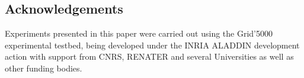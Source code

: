\documentclass[doublespacing]{bmcart}
\begin{document}
\begin{backmatter}



\section*{Acknowledgements}
Experiments presented in this paper were carried out using the Grid'5000
experimental testbed, being developed under the INRIA ALADDIN development
action with support from CNRS, RENATER and several Universities as well as
other funding bodies.




\end{backmatter}
\end{document}
